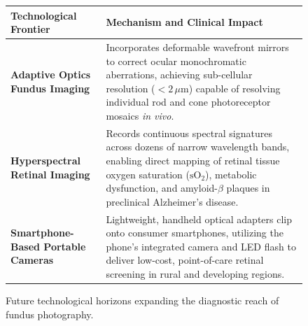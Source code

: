 \documentclass[11pt,a4paper]{article}
\begin{document}
\begin{figure}[htbp]
\centering
\setlength{\tabcolsep}{4pt}
\begin{tabular}{p{4.2cm}p{10.5cm}}
\toprule
\textbf{Technological Frontier} & \textbf{Mechanism and Clinical Impact} \\
\midrule
\textbf{Adaptive Optics Fundus Imaging} & Incorporates deformable wavefront mirrors to correct ocular monochromatic aberrations, achieving sub-cellular resolution ($< 2\,\mu\text{m}$) capable of resolving individual rod and cone photoreceptor mosaics \textit{in vivo}. \\
\addlinespace
\textbf{Hyperspectral Retinal Imaging} & Records continuous spectral signatures across dozens of narrow wavelength bands, enabling direct mapping of retinal tissue oxygen saturation ($\text{sO}_2$), metabolic dysfunction, and amyloid-$\beta$ plaques in preclinical Alzheimer's disease. \\
\addlinespace
\textbf{Smartphone-Based Portable Cameras} & Lightweight, handheld optical adapters clip onto consumer smartphones, utilizing the phone's integrated camera and LED flash to deliver low-cost, point-of-care retinal screening in rural and developing regions. \\
\bottomrule
\end{tabular}
\caption{Future technological horizons expanding the diagnostic reach of fundus photography.}
\label{tab:future_horizons}
\end{figure}
\end{document}
